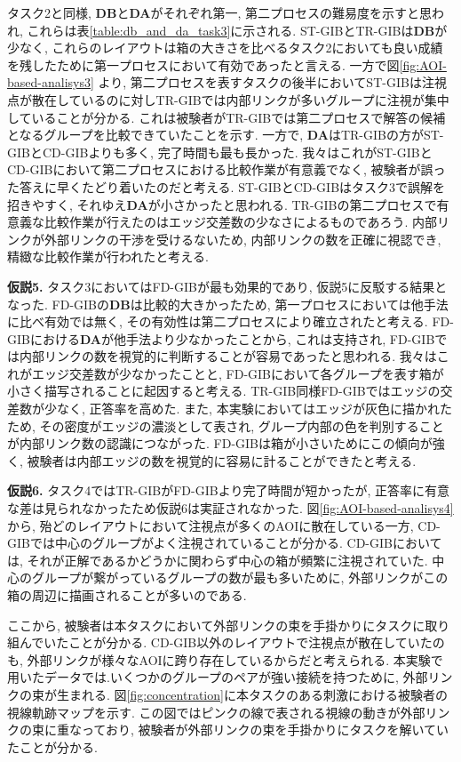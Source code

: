 \documentclass{kuee}
\begin{document}
タスク2と同様, {\bf DB}と{\bf DA}がそれぞれ第一, 第二プロセスの難易度を示すと思われ, これらは表\ref{table:db_and_da_task3}に示される.
ST-GIBとTR-GIBは{\bf DB}が少なく, これらのレイアウトは箱の大きさを比べるタスク2においても良い成績を残したために第一プロセスにおいて有効であったと言える.
一方で図\ref{fig:AOI-based-analisys3} より, 第二プロセスを表すタスクの後半においてST-GIBは注視点が散在しているのに対しTR-GIBでは内部リンクが多いグループに注視が集中していることが分かる.
これは被験者がTR-GIBでは第二プロセスで解答の候補となるグループを比較できていたことを示す.
一方で, {\bf DA}はTR-GIBの方がST-GIBとCD-GIBよりも多く, 完了時間も最も長かった.
我々はこれがST-GIBとCD-GIBにおいて第二プロセスにおける比較作業が有意義でなく, 被験者が誤った答えに早くたどり着いたのだと考える.
ST-GIBとCD-GIBはタスク3で誤解を招きやすく, それゆえ{\bf DA}が小さかったと思われる.
TR-GIBの第二プロセスで有意義な比較作業が行えたのはエッジ交差数の少なさによるものであろう.
内部リンクが外部リンクの干渉を受けるないため, 内部リンクの数を正確に視認でき, 精緻な比較作業が行われたと考える.

{\bf 仮説5.} タスク3においてはFD-GIBが最も効果的であり, 仮説5に反駁する結果となった.
FD-GIBの{\bf DB}は比較的大きかったため, 第一プロセスにおいては他手法に比べ有効では無く, その有効性は第二プロセスにより確立されたと考える.
FD-GIBにおける{\bf DA}が他手法より少なかったことから, これは支持され, FD-GIBでは内部リンクの数を視覚的に判断することが容易であったと思われる.
我々はこれがエッジ交差数が少なかったことと, FD-GIBにおいて各グループを表す箱が小さく描写されることに起因すると考える.
TR-GIB同様FD-GIBではエッジの交差数が少なく, 正答率を高めた.
また, 本実験においてはエッジが灰色に描かれたため, その密度がエッジの濃淡として表され, グループ内部の色を判別することが内部リンク数の認識につながった.
FD-GIBは箱が小さいためにこの傾向が強く, 被験者は内部エッジの数を視覚的に容易に計ることができたと考える.

{\bf 仮説6.} タスク4ではTR-GIBがFD-GIBより完了時間が短かったが, 正答率に有意な差は見られなかったため仮説6は実証されなかった.
図\ref{fig:AOI-based-analisys4} から, 殆どのレイアウトにおいて注視点が多くのAOIに散在している一方, CD-GIBでは中心のグループがよく注視されていることが分かる.
CD-GIBにおいては, それが正解であるかどうかに関わらず中心の箱が頻繁に注視されていた.
中心のグループが繋がっているグループの数が最も多いために, 外部リンクがこの箱の周辺に描画されることが多いのである.

ここから, 被験者は本タスクにおいて外部リンクの束を手掛かりにタスクに取り組んでいたことが分かる.
CD-GIB以外のレイアウトで注視点が散在していたのも, 外部リンクが様々なAOIに跨り存在しているからだと考えられる.
本実験で用いたデータでは.いくつかのグループのペアが強い接続を持つために, 外部リンクの束が生まれる.
図\ref{fig:concentration}に本タスクのある刺激における被験者の視線軌跡マップを示す.
この図ではピンクの線で表される視線の動きが外部リンクの束に重なっており, 被験者が外部リンクの束を手掛かりにタスクを解いていたことが分かる.
\end{document}
